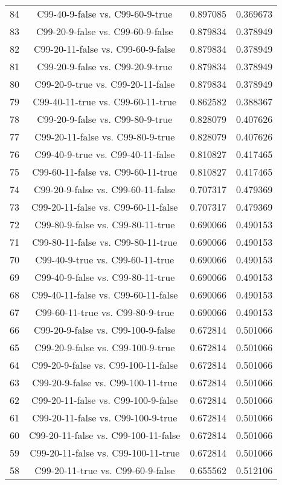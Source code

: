 \documentclass[a4paper,10pt]{article}
\begin{document}
\begin{landscape}
\begin{table}[!htp]
\begin{tabular}{cccc}
84&C99-40-9-false vs. C99-60-9-true&0.897085&0.369673\\
83&C99-20-9-false vs. C99-60-9-false&0.879834&0.378949\\
82&C99-20-11-false vs. C99-60-9-false&0.879834&0.378949\\
81&C99-20-9-false vs. C99-20-9-true&0.879834&0.378949\\
80&C99-20-9-true vs. C99-20-11-false&0.879834&0.378949\\
79&C99-40-11-true vs. C99-60-11-true&0.862582&0.388367\\
78&C99-20-9-false vs. C99-80-9-true&0.828079&0.407626\\
77&C99-20-11-false vs. C99-80-9-true&0.828079&0.407626\\
76&C99-40-9-true vs. C99-40-11-false&0.810827&0.417465\\
75&C99-60-11-false vs. C99-60-11-true&0.810827&0.417465\\
74&C99-20-9-false vs. C99-60-11-false&0.707317&0.479369\\
73&C99-20-11-false vs. C99-60-11-false&0.707317&0.479369\\
72&C99-80-9-false vs. C99-80-11-true&0.690066&0.490153\\
71&C99-80-11-false vs. C99-80-11-true&0.690066&0.490153\\
70&C99-40-9-true vs. C99-60-11-true&0.690066&0.490153\\
69&C99-40-9-false vs. C99-80-11-true&0.690066&0.490153\\
68&C99-40-11-false vs. C99-60-11-false&0.690066&0.490153\\
67&C99-60-11-true vs. C99-80-9-true&0.690066&0.490153\\
66&C99-20-9-false vs. C99-100-9-false&0.672814&0.501066\\
65&C99-20-9-false vs. C99-100-9-true&0.672814&0.501066\\
64&C99-20-9-false vs. C99-100-11-false&0.672814&0.501066\\
63&C99-20-9-false vs. C99-100-11-true&0.672814&0.501066\\
62&C99-20-11-false vs. C99-100-9-false&0.672814&0.501066\\
61&C99-20-11-false vs. C99-100-9-true&0.672814&0.501066\\
60&C99-20-11-false vs. C99-100-11-false&0.672814&0.501066\\
59&C99-20-11-false vs. C99-100-11-true&0.672814&0.501066\\
58&C99-20-11-true vs. C99-60-9-false&0.655562&0.512106\\

\end{tabular}
\end{table}
\end{landscape}
\end{document}
